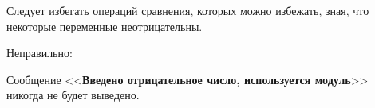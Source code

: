\begin{typerror}
	\label{TE_signed-with-unsigned-comparison}

	Следует избегать операций сравнения, которых можно избежать, зная, что некоторые переменные неотрицательны.

	Неправильно:

	Сообщение <<\textbf{Введено отрицательное число, используется модуль}>> никогда не будет выведено.
	
\end{typerror}
